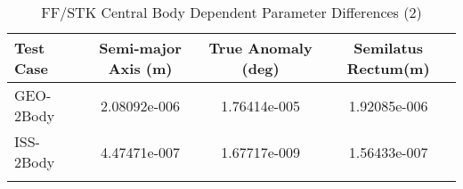 \begin{table}[htbp!]
\centering
\caption{ FF/STK Central Body Dependent Parameter Differences (2)}
      \begin{tabular}{lccc}
      \hline\hline
          Test Case & Semi-major Axis (m) & True Anomaly (deg) & Semilatus Rectum(m) \\
         \hline
         GEO-2Body & 2.08092e-006 & 1.76414e-005 & 1.92085e-006 \\
         ISS-2Body & 4.47471e-007 & 1.67717e-009 & 1.56433e-007 \\
      \hline\hline
      \label{Table: FF-STK CB Parameters Set 2} 
\end{tabular}
\end{table}
